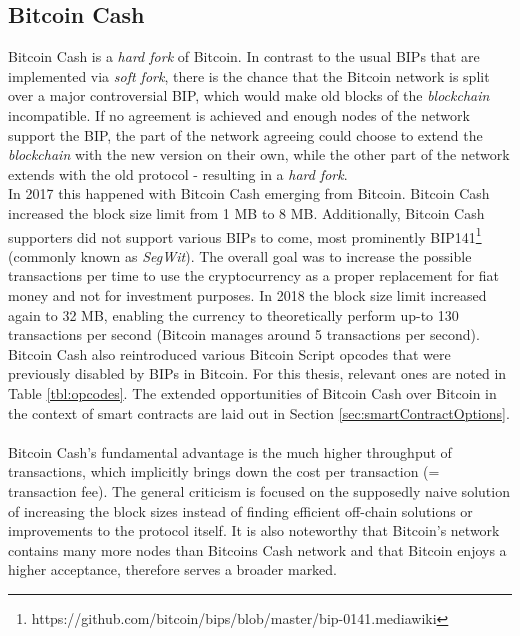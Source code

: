 \documentclass{cacthesis}
\newcounter{protocol}
\begin{document}
        \subsection{Bitcoin Cash}
        \label{sec:BitcoinCash}
        Bitcoin Cash is a \textit{hard fork} of Bitcoin. In contrast to the usual BIPs that are implemented via \textit{soft fork}, there is the chance that the Bitcoin network is split over a major controversial BIP, which would make old blocks of the \textit{blockchain} incompatible. If no agreement is achieved and enough nodes of the network support the BIP, the part of the network agreeing could choose to extend the \textit{blockchain} with the new version on their own, while the other part of the network extends with the old protocol - resulting in a \textit{hard fork}. \\
        In 2017 this happened with Bitcoin Cash emerging from Bitcoin. Bitcoin Cash increased the block size limit from 1 MB to 8 MB. Additionally, Bitcoin Cash supporters did not support various BIPs to come, most prominently BIP141\footnote{https://github.com/bitcoin/bips/blob/master/bip-0141.mediawiki} (commonly known as \textit{SegWit}). The overall goal was to increase the possible transactions per time to use the cryptocurrency as a proper replacement for fiat money and not for investment purposes. In 2018 the block size limit increased again to 32 MB, enabling the currency to theoretically perform up-to 130 transactions per second (Bitcoin manages around 5 transactions per second). Bitcoin Cash also reintroduced various Bitcoin Script opcodes that were previously disabled by BIPs in Bitcoin. For this thesis, relevant ones are noted in Table \ref{tbl:opcodes}. The extended opportunities of Bitcoin Cash over Bitcoin in the context of smart contracts are laid out in Section \ref{sec:smartContractOptions}. \\\\
        Bitcoin Cash's fundamental advantage is the much higher throughput of transactions, which implicitly brings down the cost per transaction (= transaction fee). The general criticism is focused on the supposedly naive solution of increasing the block sizes instead of finding efficient off-chain solutions or improvements to the protocol itself. It is also noteworthy that Bitcoin's network contains many more nodes than Bitcoins Cash network and that Bitcoin enjoys a higher acceptance, therefore serves a broader marked.
        
\end{document}

